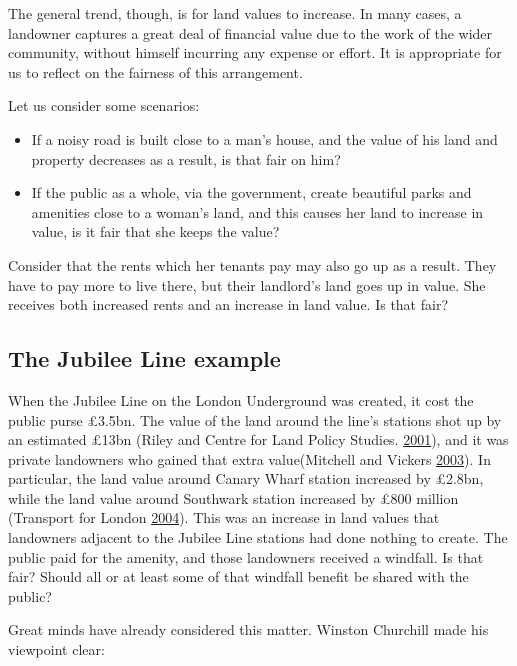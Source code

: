 \documentclass[]{tufte-handout}
\providecommand{\tightlist}{%
  \setlength{\itemsep}{0pt}\setlength{\parskip}{0pt}}
\begin{document}
The general trend, though, is for land values to increase. In many
cases, a landowner captures a great deal of financial value due to the
work of the wider community, without himself incurring any expense or
effort. It is appropriate for us to reflect on the fairness of this
arrangement.

Let us consider some scenarios:

\begin{itemize}
\tightlist
\item
  If a noisy road is built close to a man's house, and the value of his
  land and property decreases as a result, is that fair on him?\\
\item
  If the public as a whole, via the government, create beautiful parks
  and amenities close to a woman's land, and this causes her land to
  increase in value, is it fair that she keeps the value?
\end{itemize}

Consider that the rents which her tenants pay may also go up as a
result. They have to pay more to live there, but their landlord's land
goes up in value. She receives both increased rents and an increase in
land value. Is that fair?

\hypertarget{the-jubilee-line-example}{%
\subsection{The Jubilee Line example}\label{the-jubilee-line-example}}

When the Jubilee Line on the London Underground was created, it cost the
public purse £3.5bn. The value of the land around the line's stations
shot up by an estimated £13bn (Riley and Centre for Land Policy Studies.
\protect\hyperlink{ref-Riley2001}{2001}), and it was private landowners
who gained that extra value(Mitchell and Vickers
\protect\hyperlink{ref-Mitchell}{2003}). In particular, the land value
around Canary Wharf station increased by £2.8bn, while the land value
around Southwark station increased by £800 million (Transport for London
\protect\hyperlink{ref-TransportforLondon2004}{2004}). This was an
increase in land values that landowners adjacent to the Jubilee Line
stations had done nothing to create. The public paid for the amenity,
and those landowners received a windfall. Is that fair? Should all or at
least some of that windfall benefit be shared with the public?

Great minds have already considered this matter. Winston Churchill made
his viewpoint clear:
\end{document}
